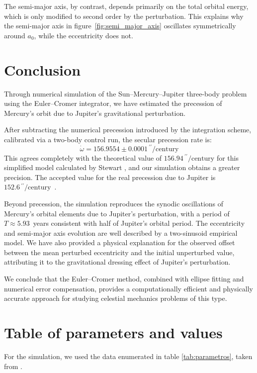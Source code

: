 \documentclass[journal]{IEEEtran}
\begin{document}
The semi-major axis, by contrast, depends primarily on the total orbital energy, which is only modified to second order by the perturbation. This explains why the semi-major axis in figure~\ref{fig:semi_major_axis} oscillates symmetrically around $a_0$, while the eccentricity does not.

\section{Conclusion}

Through numerical simulation of the Sun--Mercury--Jupiter three-body problem using the Euler--Cromer integrator, we have estimated the precession of Mercury's orbit due to Jupiter's gravitational perturbation.

After subtracting the numerical precession introduced by the integration scheme, calibrated via a two-body control run, the secular precession rate is:
\begin{equation*}
    \dot\omega = 156.9554 \pm 0.0001\,{}^{\prime\prime}/\text{century}
\end{equation*}
This agrees completely with the theoretical value of $156.94\,{}^{\prime\prime}/\text{century}$ for this simplified model calculated by Stewart \cite{stewart}, and our simulation obtains a greater precision. The accepted value for the real precession due to Jupiter is $152.6\,{}^{\prime\prime}/\text{century}$~\cite{precession}.

Beyond precession, the simulation reproduces the synodic oscillations of Mercury's orbital elements due to Jupiter's perturbation, with a period of $T \approx 5.93$~years consistent with half of Jupiter's orbital period. The eccentricity and semi-major axis evolution are well described by a two-sinusoid empirical model. We have also provided a physical explanation for the observed offset between the mean perturbed eccentricity and the initial unperturbed value, attributing it to the gravitational dressing effect of Jupiter's perturbation.

We conclude that the Euler--Cromer method, combined with ellipse fitting and numerical error compensation, provides a computationally efficient and physically accurate approach for studying celestial mechanics problems of this type.

\appendix
\section{Table of parameters and values}
For the simulation, we used the data enumerated in table \ref{tab:parametros}, taken from \cite{giordano}.
\end{document}
